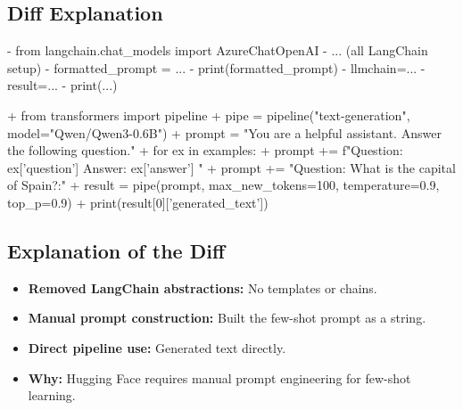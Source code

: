 \documentclass[11pt, a4paper]{article}
\begin{document}
\subsection{Diff Explanation}
\begin{removedcode}
\begin{diffverb}
- from langchain.chat_models import AzureChatOpenAI
- ... (all LangChain setup)
- formatted_prompt = ...
- print(formatted_prompt)
- llmchain=...
- result=...
- print(...)
\end{diffverb}
\end{removedcode}

\begin{addedcode}
\begin{diffverb}
+ from transformers import pipeline
+ pipe = pipeline("text-generation", model="Qwen/Qwen3-0.6B")
+ prompt = "You are a helpful assistant. Answer the following question.\n"
+ for ex in examples:
+     prompt += f"Question: {ex['question']}
Answer: {ex['answer']}
"
+ prompt += "Question: What is the capital of Spain?\nAnswer:"
+ result = pipe(prompt, max_new_tokens=100, temperature=0.9, top_p=0.9)
+ print(result[0]['generated_text'])
\end{diffverb}
\end{addedcode}


\subsection{Explanation of the Diff}
\begin{itemize}
    \item \textbf{Removed LangChain abstractions:} No templates or chains.
    \item \textbf{Manual prompt construction:} Built the few-shot prompt as a string.
    \item \textbf{Direct pipeline use:} Generated text directly.
    \item \textbf{Why:} Hugging Face requires manual prompt engineering for few-shot learning.
\end{itemize}


\newpage
\end{document}
